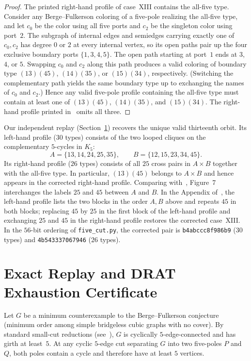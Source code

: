 \documentclass[11pt]{article}
\theoremstyle{remark}
\begin{document}
\begin{proof}
The printed right-hand profile of case~XIII contains the all-five type. Consider any
Berge--Fulkerson coloring of a five-pole realizing the all-five type, and let $c_0$ be
the color using all five ports and $c_2$ be the singleton color using port~$2$. The
subgraph of internal edges and semiedges carrying exactly one of $c_0, c_2$ has degree
$0$ or $2$ at every internal vertex, so its open paths pair up the four exclusive
boundary ports $\{1,3,4,5\}$. The open path starting at port~$1$ ends at $3$, $4$, or
$5$. Swapping $c_0$ and $c_2$ along this path produces a valid coloring of boundary type
$(13)(45)$, $(14)(35)$, or $(15)(34)$, respectively. (Switching the complementary path
yields the same boundary type up to exchanging the names of $c_0$ and $c_2$.) Hence any
valid five-pole profile containing the all-five type must contain at least one of
$(13)(45)$, $(14)(35)$, and $(15)(34)$. The right-hand profile printed in~\cite{MMT}
omits all three.
\end{proof}

Our independent replay (Section~\ref{sec:replay}) recovers the unique valid thirteenth
orbit. Its left-hand profile ($30$ types) consists of the two looped cliques on the
complementary $5$-cycles in $K_5$:
\[
  A = \{13, 14, 24, 25, 35\}, \qquad B = \{12, 15, 23, 34, 45\}.
\]
Its right-hand profile ($26$ types) consists of all $25$ cross pairs in $A \times B$
together with the all-five type. In particular, $(13)(45)$ belongs to $A \times B$ and
hence appears in the corrected right-hand profile. Comparing with~\cite{MMT}, Figure~7
interchanges the labels $25$ and $45$ between $A$ and $B$. In the Appendix of~\cite{MMT},
the left-hand profile lists the two blocks in the order $A, B$ above and repeats $45$ in
both blocks; replacing $45$ by $25$ in the first block of the left-hand profile and
exchanging $25$ and $45$ in the right-hand profile restores the corrected case~XIII. In
the $56$-bit ordering of \texttt{five\_cut.py}, the corrected pair is
\texttt{b4abccc8f986b9} ($30$ types) and \texttt{4b543337067946} ($26$ types).

\section{Exact Replay and DRAT Exhaustion Certificate}\label{sec:replay}

Let $G$ be a minimum counterexample to the Berge--Fulkerson conjecture (minimum order
among simple bridgeless cubic graphs with no cover). By standard small-cut reductions
(see~\cite{MMT}), $G$ is cyclically $5$-edge-connected and has girth at least~$5$. At
any cyclic $5$-edge cut separating $G$ into two five-poles $P$ and $Q$, both poles
contain a cycle and therefore have at least $5$ vertices.
\end{document}
